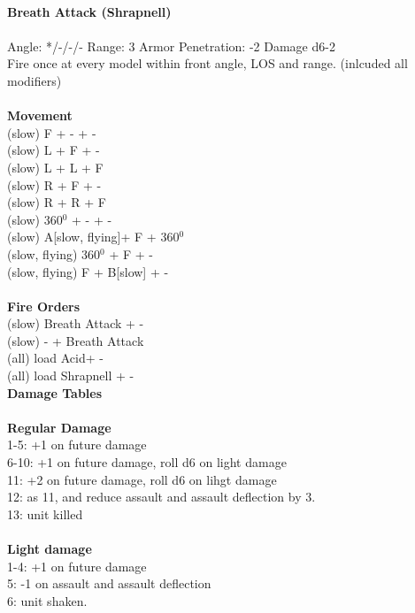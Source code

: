 \ \\
{\bf Breath Attack (Shrapnell) } \\
\ \\
Angle: */-/-/- Range: 3 Armor Penetration: -2 Damage d6-2 \\
\indent Fire once at every model within front angle, LOS and range. (inlcuded all modifiers) \\





\ \\ {\bf Movement } \\
(slow) F + - + - \\
(slow) L + F + - \\
(slow) L + L + F \\
(slow) R + F + - \\
(slow) R + R + F \\
(slow) 360$^0$ + - + - \\
(slow) A[slow, flying]+ F + 360$^0$ \\
(slow, flying) 360$^0$ + F + - \\
(slow, flying) F + B[slow] + - \\
\ \\ {\bf Fire Orders } \\
(slow) Breath Attack + -  \\
(slow) - + Breath Attack \\
(all) load Acid+ -  \\
(all) load Shrapnell + -  \\



{\bf Damage Tables} \\
\ \\ {\bf Regular Damage } \\
1-5: +1 on future damage \\
6-10: +1 on future damage, roll d6 on light damage \\
11: +2 on future damage, roll d6 on lihgt damage \\
12: as 11, and reduce assault and assault deflection by 3. \\
13: unit killed \\
\ \\ {\bf Light damage } \\
1-4: +1 on future damage \\
5: -1 on assault and assault deflection \\
6: unit shaken. \\


